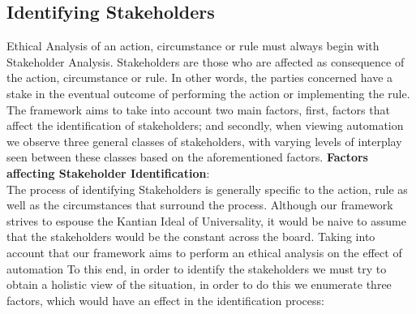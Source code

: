\subsection{Identifying Stakeholders}
\label{sec:-identify}
Ethical Analysis of an action, circumstance or rule must always begin with Stakeholder Analysis. Stakeholders are those who are affected as consequence of the action, circumstance or rule. In other words, the parties concerned have a stake in the eventual outcome of performing the action or implementing the rule.\\
The framework aims to take into account two main factors, first, factors that affect the identification of stakeholders; and secondly, when viewing automation we observe three general classes of stakeholders, with varying levels of interplay seen between these classes based on the aforementioned factors.
\textbf{Factors affecting Stakeholder Identification}:\\
The process of identifying Stakeholders is generally specific to the action, rule as well as the circumstances that surround the process. Although our framework strives to espouse the Kantian Ideal of Universality, it would be naive to assume that the stakeholders would be the constant across the board. Taking into account that our framework aims to perform an ethical analysis on the effect of automation
To this end, in order to identify the stakeholders we must try to obtain a holistic view of the situation, in order to do this we enumerate three factors, which would have an effect in the identification process:\\
